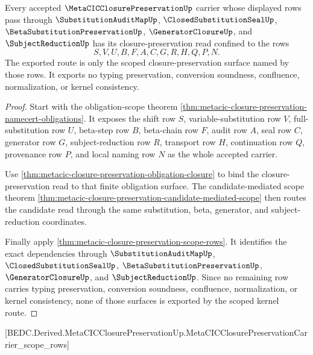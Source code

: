 \begin{theorem}
\label{thm:metacic-closure-preservation-scoped-kernel-route}
Every accepted $\MetaCICClosurePreservationUp$ carrier whose displayed rows pass through $\SubstitutionAuditMapUp$, $\ClosedSubstitutionSealUp$, $\BetaSubstitutionPreservationUp$, $\GeneratorClosureUp$, and $\SubjectReductionUp$ has its closure-preservation read confined to the rows
$$
S,V,U,B,F,A,C,G,R,H,Q,P,N.
$$
The exported route is only the scoped closure-preservation surface named by those rows. It exports no typing preservation, conversion soundness, confluence, normalization, or kernel consistency.
\end{theorem}
\begin{proof}
Start with the obligation-scope theorem \autoref{thm:metacic-closure-preservation-namecert-obligations}. It exposes the shift row $S$, variable-substitution row $V$, full-substitution row $U$, beta-step row $B$, beta-chain row $F$, audit row $A$, seal row $C$, generator row $G$, subject-reduction row $R$, transport row $H$, continuation row $Q$, provenance row $P$, and local naming row $N$ as the whole accepted carrier.

Use \autoref{thm:metacic-closure-preservation-obligation-closure} to bind the closure-preservation read to that finite obligation surface. The candidate-mediated scope theorem \autoref{thm:metacic-closure-preservation-candidate-mediated-scope} then routes the candidate read through the same substitution, beta, generator, and subject-reduction coordinates.

Finally apply \autoref{thm:metacic-closure-preservation-scope-rows}. It identifies the exact dependencies through $\SubstitutionAuditMapUp$, $\ClosedSubstitutionSealUp$, $\BetaSubstitutionPreservationUp$, $\GeneratorClosureUp$, and $\SubjectReductionUp$. Since no remaining row carries typing preservation, conversion soundness, confluence, normalization, or kernel consistency, none of those surfaces is exported by the scoped kernel route.
\end{proof}

[BEDC.Derived.MetaCICClosurePreservationUp.MetaCICClosurePreservationCarrier\_scope\_rows]

